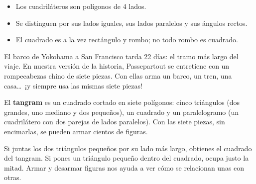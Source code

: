 \documentclass[11pt]{article}
\begin{document}
\begin{resumen}
\begin{itemize}
  \item Los cuadriláteros son polígonos de 4 lados.
  \item Se distinguen por sus lados iguales, sus lados paralelos y sus ángulos rectos.
  \item El cuadrado es a la vez rectángulo y rombo; no todo rombo es cuadrado.
\end{itemize}
\end{resumen}

\label{tema:tangram}

\begin{hilo}
El barco de Yokohama a San Francisco tarda 22 días: el tramo más largo del
viaje. En nuestra versión de la historia, Passepartout se entretiene con un
rompecabezas chino de siete piezas. Con ellas arma un barco, un tren, una
casa\ldots\ ¡y siempre usa las mismas siete piezas!
\end{hilo}

El \textbf{tangram} es un cuadrado cortado en siete polígonos: cinco
triángulos (dos grandes, uno mediano y dos pequeños), un cuadrado y un
paralelogramo (un cuadrilátero con dos parejas de lados paralelos). Con las
siete piezas, sin encimarlas, se pueden armar cientos de figuras.

\begin{center}
\end{center}

\begin{ejemplo}
Si juntas los dos triángulos pequeños por su lado más largo, obtienes el
cuadrado del tangram. Si pones un triángulo pequeño dentro del cuadrado,
ocupa justo la mitad. Armar y desarmar figuras nos ayuda a ver cómo se
relacionan unas con otras.
\end{ejemplo}
\end{document}
